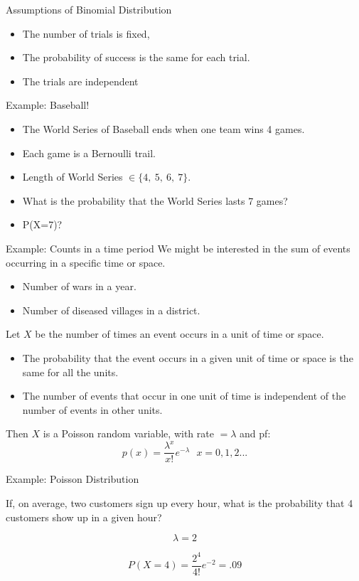 \documentclass{beamer}
\numberwithin{equation}{section}
\begin{document}
\begin{frame}{Assumptions of Binomial Distribution}
\begin{itemize}
\item The number of trials is fixed,
\item The probability of success is the same for each trial.
\item The trials are independent
\end{itemize}
\end{frame}

\begin{frame}{Example: Baseball!}
\begin{itemize}
\item The World Series of Baseball ends when one team wins 4 games.
\item Each game is a Bernoulli trail.\pause
\item Length of World Series $\in\{4,\ 5,\ 6,\ 7\}$.
\item What is the probability that the World Series lasts 7 games? \pause
\item P(X=7)?
\end{itemize}
\end{frame}



\begin{frame}{Example: Counts in a time period}
We might be interested in the sum of events occurring in a specific time or space.\pause
\begin{itemize}
\item Number of wars in a year.
\item Number of diseased villages in a district.
\end{itemize}
\pause
Let $X$ be the number of times an event occurs in a unit of time or space.
\begin{itemize}
\item The probability that the event occurs in a given unit of time or space is the same for all the units.
\item The number of events that occur in one unit of time is independent of the number of events in other units.
\end{itemize}
\pause
Then $X$ is a Poisson random variable, with rate $= \lambda$ and pf:
$$p(x)=\frac{\lambda^x}{x!} e^{-\lambda}\ \ \ x=0,1,2...$$
\end{frame}

\begin{frame}{Example: Poisson Distribution}

If, on average, two customers sign up every hour, what is the probability that 4 customers show up in a given hour?\pause

$$\lambda=2$$\pause

$$P(X=4)=\frac{2^4}{4!} e^{-2}=.09$$

\end{frame}
\end{document}
